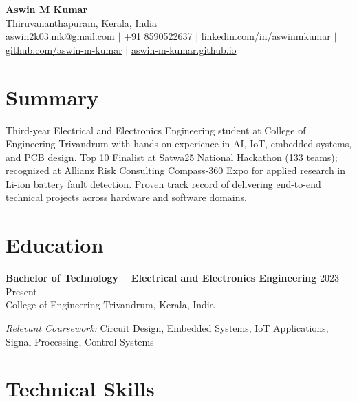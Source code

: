 \documentclass[a4paper,11pt]{article}
\begin{document}

\begin{center}
  {\LARGE \textbf{Aswin M Kumar}}\\[4pt]
  Thiruvananthapuram, Kerala, India\\[2pt]
  \href{mailto:aswin2k03.mk@gmail.com}{aswin2k03.mk@gmail.com}
  \;$|$\; +91 8590522637
  \;$|$\; \href{https://www.linkedin.com/in/aswinmkumar}{linkedin.com/in/aswinmkumar}
  \;$|$\; \href{https://github.com/aswin-m-kumar}{github.com/aswin-m-kumar}
  \;$|$\; \href{https://aswin-m-kumar.github.io}{aswin-m-kumar.github.io}
\end{center}


\section{Summary}

Third-year Electrical and Electronics Engineering student at College of Engineering Trivandrum with hands-on experience in AI, IoT, embedded systems, and PCB design. Top 10 Finalist at Satwa25 National Hackathon (133 teams); recognized at Allianz Risk Consulting Compass-360 Expo for applied research in Li-ion battery fault detection. Proven track record of delivering end-to-end technical projects across hardware and software domains.


\section{Education}

\noindent
\textbf{Bachelor of Technology -- Electrical and Electronics Engineering} \hfill 2023 -- Present\\
College of Engineering Trivandrum, Kerala, India

\smallskip
\noindent\textit{Relevant Coursework:} Circuit Design, Embedded Systems, IoT Applications, Signal Processing, Control Systems


\section{Technical Skills}
\end{document}
